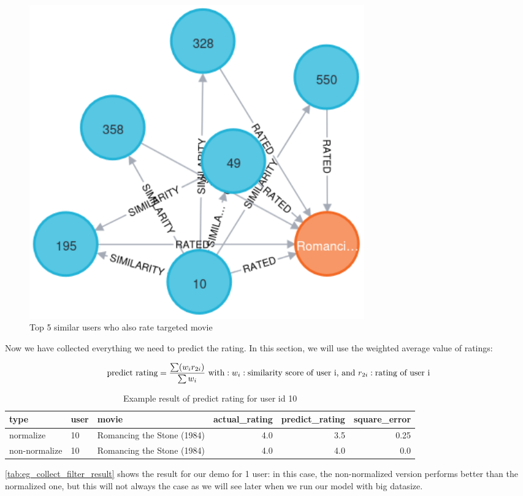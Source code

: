 \documentclass{article}
\begin{document}
\begin{figure}[htbp]
    \centering
    \includegraphics[width=0.7\textwidth]{figures/graph-5knn-similar-user.png} 
    \caption{Top 5 similar users who also rate targeted movie}
    \label{fig:graph-5knn-similar-user}
\end{figure}

Now we have collected everything we need to predict the rating. In this section, we will use the weighted average value of ratings: 

\[
\text{predict rating} = \frac{\sum(w_i r_{2i})}{\sum{w_i}} \\
\text{ with}: w_i: \text{similarity score of user i, and } r_{2i}: \text{rating of user i}
\]


\begin{table}[H]
    \centering
    \caption{Example result of predict rating for user id 10} 
    \label{tab:eg_collect_filter_result} 
    \begin{tabular}{lllrrr}
    \hline
        type & user & movie & actual\_rating & predict\_rating & square\_error \\ \hline
        normalize & 10 & Romancing the Stone (1984) & 4.0 & 3.5 & 0.25 \\ 
        non-normalize & 10 & Romancing the Stone (1984) & 4.0 & 4.0 & 0.0 \\ \hline
    \end{tabular}
\end{table}

\autoref{tab:eg_collect_filter_result} shows the result for our demo for 1 user: in this case, the non-normalized version performs better than the normalized one, but this will not always the case as we will see later when we run our model with big datasize. 
\end{document}
